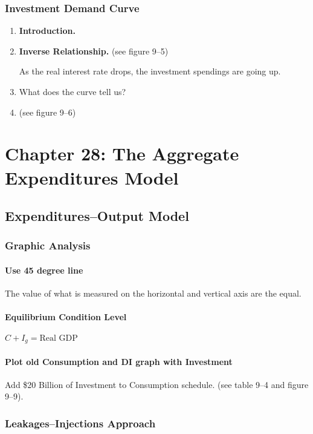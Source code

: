 \subsubsection{Investment Demand Curve}

\begin{enumerate}
	\item \textbf{Introduction.}
	\item \textbf{Inverse Relationship.} (see figure 9--5)

		As the real interest rate drops, the investment spendings are going up.

	\item What does the curve tell us?
	\item (see figure 9--6)
\end{enumerate}

\newpage
\section{Chapter 28: The Aggregate Expenditures Model}

\subsection{Expenditures--Output Model}

\subsubsection{Graphic Analysis}

\paragraph{Use 45 degree line} The value of what is measured on the horizontal and vertical axis are the equal.

\paragraph{Equilibrium Condition Level} $C + I_g = \text{Real GDP}$

\paragraph{Plot old Consumption and DI graph with Investment} Add \$20 Billion of Investment to Consumption schedule. (see table 9--4 and figure 9--9).

\subsubsection{Leakages--Injections Approach}

